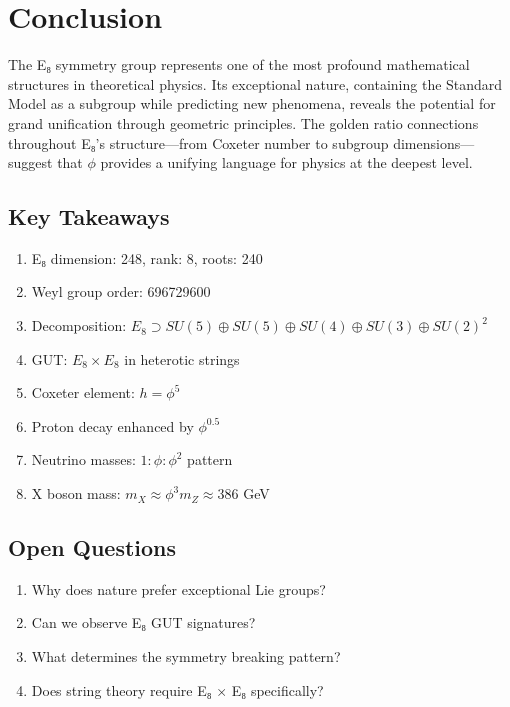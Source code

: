 \section{Conclusion}

The E₈ symmetry group represents one of the most profound mathematical structures in theoretical physics. Its exceptional nature, containing the Standard Model as a subgroup while predicting new phenomena, reveals the potential for grand unification through geometric principles. The golden ratio connections throughout E₈'s structure—from Coxeter number to subgroup dimensions—suggest that $\phi$ provides a unifying language for physics at the deepest level.

\subsection*{Key Takeaways}

\begin{enumerate}
\item E₈ dimension: 248, rank: 8, roots: 240
\item Weyl group order: 696729600
\item Decomposition: $E_8 \supset SU(5) \oplus SU(5) \oplus SU(4) \oplus SU(3) \oplus SU(2)^2$
\item GUT: $E_8 \times E_8$ in heterotic strings
\item Coxeter element: $h = \phi^5$
\item Proton decay enhanced by $\phi^{0.5}$
\item Neutrino masses: $1:\phi:\phi^2$ pattern
\item X boson mass: $m_X \approx \phi^3 m_Z \approx 386$ GeV
\end{enumerate}

\subsection*{Open Questions}

\begin{enumerate}
\item Why does nature prefer exceptional Lie groups?
\item Can we observe E₈ GUT signatures?
\item What determines the symmetry breaking pattern?
\item Does string theory require E₈ × E₈ specifically?
\end{enumerate}


